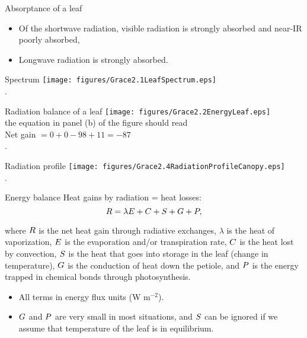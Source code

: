 \documentclass[10pt]{beamer}
\begin{document}
\begin{frame}{Absorptance of a leaf}
    \begin{itemize}
        \item Of the shortwave radiation, visible radiation is
        strongly absorbed and near-IR poorly absorbed,
        \item Longwave radiation is strongly absorbed.
    \end{itemize}
\end{frame}

\begin{frame}{Spectrum}
    \centering\texttt{[image: figures/Grace2.1LeafSpectrum.eps]}\\
    {\small \autocite[from][]{Grace1983}.}
\end{frame}

\begin{frame}{Radiation balance of a leaf}
    \centering\texttt{[image: figures/Grace2.2EnergyLeaf.eps]}\\
    {\footnotesize the equation in panel (b) of the figure should read\\
    Net gain $=0+0-98+11=-87$}\\
     {\small \autocite[from][]{Grace1983}.}
\end{frame}

\begin{frame}{Radiation profile}
    \centering\texttt{[image: figures/Grace2.4RadiationProfileCanopy.eps]}\\
    {\small \autocite[from][]{Grace1983}.}
\end{frame}

\begin{frame}{Energy balance}
    Heat gains by radiation = heat losses:
    $$\boldmath R = \lambda E + C + S + G + P,$$%
    \begin{small}
    where $\boldmath R$ is the net heat gain through radiative
    exchanges, $\lambda$ is the heat of vaporization, $\boldmath E$
    is the evaporation and/or transpiration rate, $\boldmath C$ is
    the heat lost by convection, $\boldmath S$ is the heat that goes
    into storage in the leaf (change in temperature), $\boldmath G$
    is the conduction of heat down the petiole, and $\boldmath P$ is
    the energy trapped in chemical bonds through photosynthesis.
    \begin{itemize}
        \item All terms in energy flux units (W m$^{-2}$).
        \item $\boldmath G$ and $\boldmath P$ are very small in
        most situations, and $\boldmath S$ can be ignored if we assume that
        temperature of the leaf is in equilibrium.
    \end{itemize}
    \end{small}
\end{frame}
\end{document}
